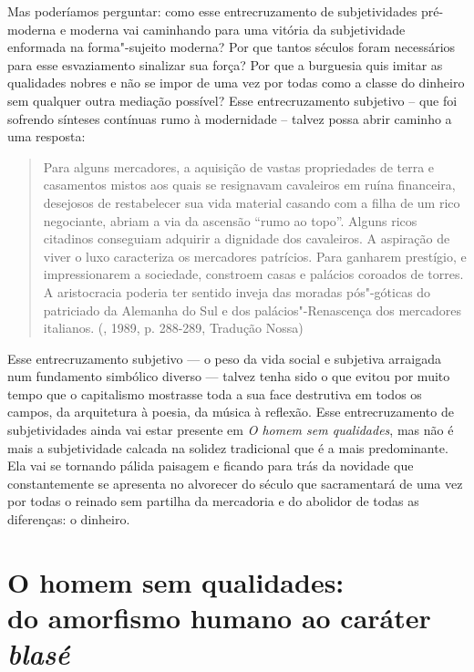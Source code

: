 Mas poderíamos perguntar: como esse entrecruzamento de subjetividades
pré-moderna e moderna vai caminhando para uma vitória da subjetividade
enformada na forma"-sujeito moderna? Por que tantos séculos foram
necessários para esse esvaziamento sinalizar sua força? Por que a
burguesia quis imitar as qualidades nobres e não se impor de uma vez por
todas como a classe do dinheiro sem qualquer outra mediação possível?
Esse entrecruzamento subjetivo -- que foi sofrendo sínteses contínuas
rumo à modernidade -- talvez possa abrir caminho a uma resposta:

\begin{quote}
Para alguns mercadores, a aquisição de vastas propriedades de terra e
casamentos mistos aos quais se resignavam cavaleiros em ruína
financeira, desejosos de restabelecer sua vida material casando com a
filha de um rico negociante, abriam a via da ascensão ``rumo ao topo''.
Alguns ricos citadinos conseguiam adquirir a dignidade dos cavaleiros. A
aspiração de viver o luxo caracteriza os mercadores patrícios. Para
ganharem prestígio, e impressionarem a sociedade, constroem casas e
palácios coroados de torres. A aristocracia poderia ter sentido inveja
das moradas pós"-góticas do patriciado da Alemanha do Sul e dos
palácios"-Renascença dos mercadores italianos. (, 1989, p.
288-289, Tradução Nossa)
\end{quote}

Esse entrecruzamento subjetivo --- o peso da vida social e subjetiva arraigada
num fundamento simbólico diverso --- talvez tenha sido o que evitou por muito
tempo que o capitalismo mostrasse toda a sua face destrutiva em todos os
campos, da arquitetura à poesia, da música à reflexão. Esse
entrecruzamento de subjetividades ainda vai estar presente em \emph{O
homem sem qualidades}, mas não é mais a subjetividade calcada na solidez
tradicional que é a mais predominante. Ela vai se tornando pálida
paisagem e ficando para trás da novidade que constantemente se apresenta
no alvorecer do século  que sacramentará de uma vez por todas o
reinado sem partilha da mercadoria e do abolidor de todas as diferenças:
o dinheiro.

\chapter*{O homem sem qualidades:\\ do amorfismo humano ao caráter \emph{blasé}}

